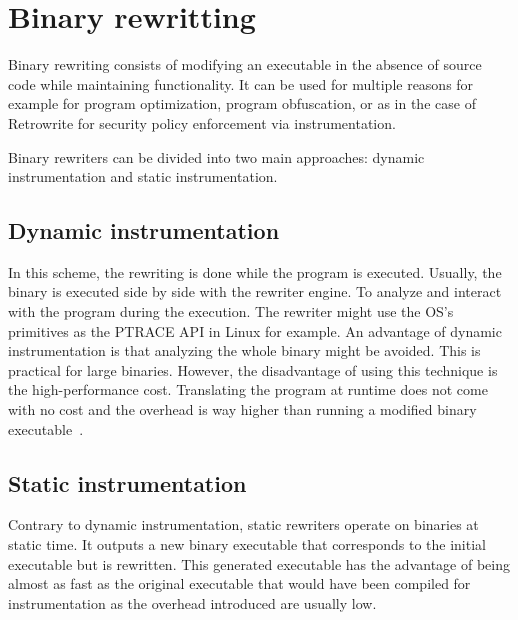 \documentclass[a4paper,11pt,oneside]{report}
\newcommand{\sysname}{Retrowrite\xspace}
\begin{document}
\section{Binary rewritting}
Binary rewriting consists of modifying an executable in the absence of source
code while maintaining functionality. It can be used for multiple reasons 
for example for program optimization, program obfuscation, or as in the case of
\sysname for security policy enforcement via instrumentation. 


Binary rewriters can be divided into two main approaches: dynamic
instrumentation and static instrumentation.

\subsection{Dynamic instrumentation}
In this scheme, the rewriting is done while the program is executed. Usually,
the binary is executed side by side with the rewriter engine. To
analyze and interact with the program during the execution. The rewriter might
use the OS's primitives as the PTRACE API in Linux for example.  An advantage of
dynamic instrumentation is that analyzing the whole binary might be avoided.
This is practical for large binaries. However, the disadvantage of using this
technique is the high-performance cost. Translating the program at runtime does
not come with no cost and the overhead is way higher than running a modified
binary executable~\cite{dinesh20oakland}.


\subsection{Static instrumentation}
Contrary to dynamic instrumentation, static rewriters operate on binaries
at static time. It outputs a new binary executable that corresponds to the
initial executable but is rewritten. This generated executable has the advantage
of being almost as fast as the original executable that would have been
compiled for instrumentation as the overhead introduced are usually low.
\end{document}
